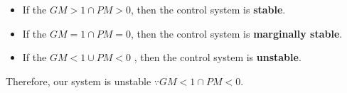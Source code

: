 \begin{itemize}
    \item If the $GM > 1 \cap PM > 0$,  then the control system is \textbf{stable}.
    \item If the $GM = 1\cap PM =0 $,  then the control system is  \textbf{marginally stable}.
    \item If the $GM < 1\cup  PM < 0$ , then the control system is \textbf{unstable}.
\end{itemize}

Therefore, our system is unstable $\because GM < 1\cap  PM < 0$.



